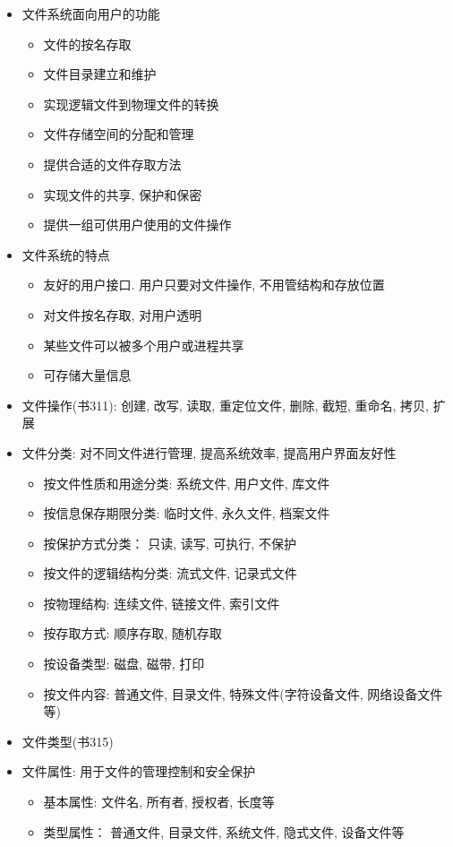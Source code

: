 \documentclass[a4paper, UTF8]{article}
\begin{document}
\begin{itemize}
\item 文件系统面向用户的功能
	\begin{itemize}
	\item 文件的按名存取
	\item 文件目录建立和维护
	\item 实现逻辑文件到物理文件的转换
	\item 文件存储空间的分配和管理
	\item 提供合适的文件存取方法
	\item 实现文件的共享, 保护和保密
	\item 提供一组可供用户使用的文件操作
	\end{itemize}
\item 文件系统的特点
	\begin{itemize}
	\item 友好的用户接口. 用户只要对文件操作, 不用管结构和存放位置
	\item 对文件按名存取, 对用户透明
	\item 某些文件可以被多个用户或进程共享
	\item 可存储大量信息
	\end{itemize}
\item 文件操作(书311): 创建, 改写, 读取, 重定位文件, 删除, 截短, 重命名, 拷贝, 扩展
\item 文件分类: 对不同文件进行管理, 提高系统效率, 提高用户界面友好性
	\begin{itemize}
	\item 按文件性质和用途分类: 系统文件, 用户文件, 库文件
	\item 按信息保存期限分类: 临时文件, 永久文件, 档案文件
	\item 按保护方式分类： 只读, 读写, 可执行, 不保护
	\item 按文件的逻辑结构分类: 流式文件, 记录式文件
	\item 按物理结构: 连续文件, 链接文件, 索引文件
	\item 按存取方式: 顺序存取, 随机存取
	\item 按设备类型: 磁盘, 磁带, 打印
	\item 按文件内容: 普通文件, 目录文件, 特殊文件(字符设备文件, 网络设备文件等)
	\end{itemize}
\item 文件类型(书315)
\item 文件属性: 用于文件的管理控制和安全保护
	\begin{itemize}
	\item 基本属性: 文件名, 所有者, 授权者, 长度等
	\item 类型属性： 普通文件, 目录文件, 系统文件, 隐式文件, 设备文件等

\end{itemize}
\end{itemize}
\end{document}

